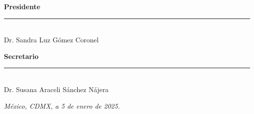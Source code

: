 \begin{table}[H]
\begin{minipage}[t][0.8\paperheight][s]{0.86\columnwidth}
\begin{center}
            \begin{minipage}{0.45\textwidth}
                \centering
                \textbf{Presidente} \\[2.0cm]
                \rule{5.5cm}{0.4pt} \\
                {\large Dr. Sandra Luz Gómez Coronel}
            \end{minipage}
            \hfill
            \begin{minipage}{0.45\textwidth}
                \centering
                \textbf{Secretario} \\[2.0cm]
                \rule{5.5cm}{0.4pt} \\
                {\large Dr. Susana Araceli Sánchez Nájera}
            \end{minipage}

            \vspace{1.5cm}




        \end{center}
    \end{minipage}

    \vspace{-1cm}
    \begin{flushright}
        \textit{México, CDMX, a 5 de enero de 2025.}
    \end{flushright}
\end{table}